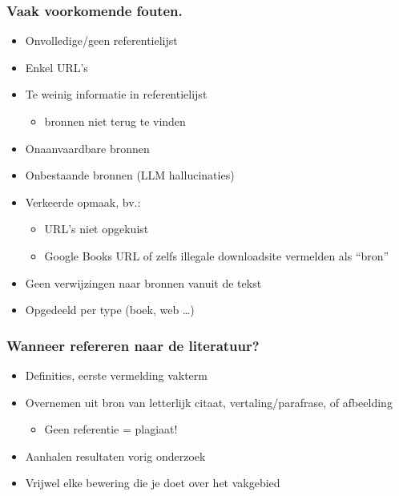 \documentclass[aspectratio=169]{beamer}
\begin{document}
\begin{frame}
  \frametitle{Vaak voorkomende fouten.}

  \begin{itemize}
    \item Onvolledige/geen referentielijst
    \item Enkel URL's
    \item Te weinig informatie in referentielijst
          \begin{itemize}
            \item[$\Rightarrow$] bronnen niet terug te vinden
          \end{itemize}
    \item Onaanvaardbare bronnen
    \item Onbestaande bronnen (LLM hallucinaties)
    \item Verkeerde opmaak, bv.:
          \begin{itemize}
            \item URL's niet opgekuist
            \item Google Books URL of zelfs illegale downloadsite vermelden als ``bron''
          \end{itemize}
    \item Geen verwijzingen naar bronnen vanuit de tekst
    \item Opgedeeld per type (boek, web \ldots)
  \end{itemize}
\end{frame}

\begin{frame}
  \frametitle{Wanneer refereren naar de literatuur?}

  \begin{itemize}
    \item Definities, eerste vermelding vakterm
    \item Overnemen uit bron van letterlijk citaat, vertaling/parafrase, of afbeelding
          \begin{itemize}
            \item Geen referentie = \alert{plagiaat!}
          \end{itemize}
    \item Aanhalen resultaten vorig onderzoek
    \item Vrijwel elke bewering die je doet over het vakgebied
  \end{itemize}

  \bigskip

\end{frame}
\end{document}
